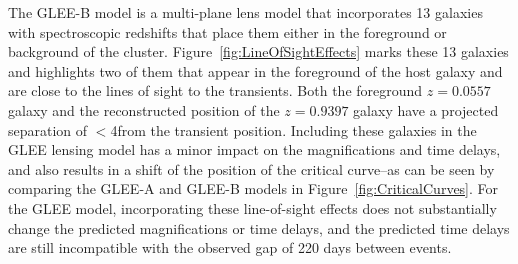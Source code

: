 The GLEE-B model is a multi-plane lens model that incorporates 13
galaxies with spectroscopic redshifts that place them either in the
foreground or background of the  cluster.
Figure~\ref{fig:LineOfSightEffects} marks these 13 galaxies and
highlights two of them that appear in the foreground of the \spock
host galaxy and are close to the lines of sight to the \spock
transients. Both the foreground $z=0.0557$ galaxy and the
reconstructed position of the $z=0.9397$ galaxy have a projected
separation of $<$4\arcsec from the \spocktwo transient position.
Including these galaxies in the GLEE lensing model has a minor impact
on the magnifications and time delays, and also results in a shift of
the position of the critical curve--as can be seen by comparing the
GLEE-A and GLEE-B models in Figure~\ref{fig:CriticalCurves}.  For the
GLEE model, incorporating these line-of-sight effects does not
substantially change the predicted magnifications or time delays, and
the predicted time delays are still incompatible with the observed gap
of 220 days between events.


